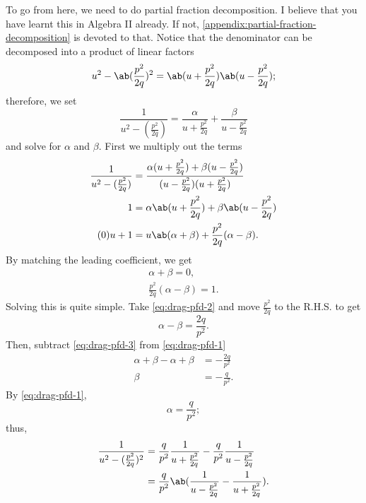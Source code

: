 To go from here, we need to do partial fraction decomposition. I believe that you have learnt this in Algebra II already. If not, \cref{appendix:partial-fraction-decomposition} is devoted to that. Notice that the denominator can be decomposed into a product of linear factors
\begin{equation}
	u^2 - \ab(\frac{p^2}{2q})^2 = \ab(u + \frac{p^2}{2q})\ab(u - \frac{p^2}{2q});
\end{equation}
therefore, we set
\begin{equation}
	\frac{1}{u^2 - (\frac{p^2}{2q})} = \frac{\alpha}{u + \frac{p^2}{2q}} + \frac{\beta}{u - \frac{p^2}{2q}}
\end{equation}
and solve for $\alpha$ and $\beta$. First we multiply out the terms
\begin{align}
	\frac{1}{u^2 - (\frac{p^2}{2q})} & = \frac{\alpha(u + \frac{p^2}{2q}) + \beta(u - \frac{p^2}{2q})}{(u - \frac{p^2}{2q})(u + \frac{p^2}{2q})} \\
	1                                & = \alpha\ab(u + \frac{p^2}{2q}) + \beta\ab(u - \frac{p^2}{2q})                                            \\
	(0)u + 1                         & = u\ab(\alpha + \beta) + \frac{p^2}{2q}(\alpha - \beta).
\end{align}
By matching the leading coefficient, we get
\begin{gather}
	\alpha + \beta = 0, \label{eq:drag-pfd-1} \\
	\frac{p^2}{2q}(\alpha - \beta) = 1. \label{eq:drag-pfd-2}
\end{gather}
Solving this is quite simple. Take \cref{eq:drag-pfd-2} and move $\frac{p^2}{2q}$ to the R.H.S. to get
\begin{equation}
	\alpha - \beta = \frac{2q}{p^2}. \label{eq:drag-pfd-3}
\end{equation}
Then, subtract \cref{eq:drag-pfd-3} from \cref{eq:drag-pfd-1}
\begin{align}
	\alpha + \beta - \alpha + \beta & = -\frac{2q}{p^2} \\
	\beta                           & = -\frac{q}{p^2}.
\end{align}
By \cref{eq:drag-pfd-1},
\begin{equation}
	\alpha = \frac{q}{p^2};
\end{equation}
thus,
\begin{align}
	\frac{1}{u^2 - (\frac{p^2}{2q})^2} & = \frac{q}{p^2}\frac{1}{u + \frac{p^2}{2q}} - \frac{q}{p^2}\frac{1}{u - \frac{p^2}{2q}} \\
	                                   & = \frac{q}{p^2}\ab(\frac{1}{u - \frac{p^2}{2q}} - \frac{1}{u + \frac{p^2}{2q}}).
\end{align}
